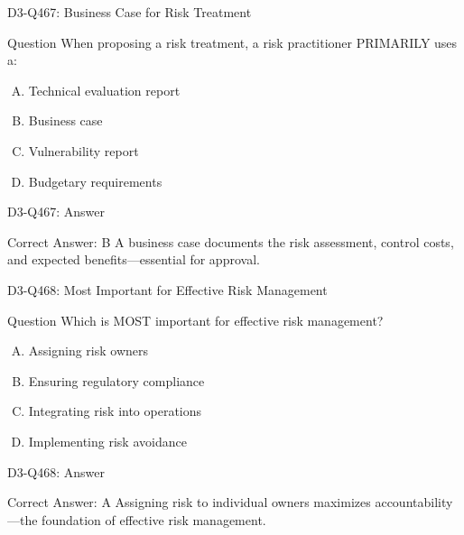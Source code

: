 \documentclass{beamer}
\begin{document}
\begin{frame}{D3-Q467: Business Case for Risk Treatment}
	\begin{block}{Question}
		When proposing a risk treatment, a risk practitioner PRIMARILY uses a:
	\end{block}
	\begin{enumerate}[(A)]
		\item Technical evaluation report
		\item Business case
		\item Vulnerability report
		\item Budgetary requirements
	\end{enumerate}
\end{frame}
\begin{frame}{D3-Q467: Answer}
	\begin{block}{Correct Answer: B}
		A business case documents the risk assessment, control costs, and expected benefits—essential for approval.
	\end{block}
\end{frame}

\begin{frame}{D3-Q468: Most Important for Effective Risk Management}
	\begin{block}{Question}
		Which is MOST important for effective risk management?
	\end{block}
	\begin{enumerate}[(A)]
		\item Assigning risk owners
		\item Ensuring regulatory compliance
		\item Integrating risk into operations
		\item Implementing risk avoidance
	\end{enumerate}
\end{frame}
\begin{frame}{D3-Q468: Answer}
	\begin{block}{Correct Answer: A}
		Assigning risk to individual owners maximizes accountability—the foundation of effective risk management.
	\end{block}
\end{frame}
\end{document}
